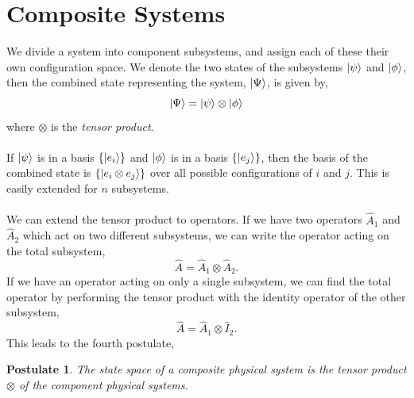 \documentclass{book}
\newtheorem{postulate}{\textbf{Postulate}}
\begin{document}
\section{Composite Systems}
We divide a system into component subsystems, and assign each of these their own configuration space. We denote the two states of the subsystems $\ket{\psi}$ and $\ket{\phi}$, then the combined state representing the system, $\ket{\Psi}$, is given by,
\begin{equation}
	\ket{\Psi}=\ket{\psi}\otimes\ket{\phi}
\end{equation}
where $\otimes$ is the \textit{tensor product}. 
\\\\
If $\ket{\psi}$ is in a basis $\left\{\ket{e_i}\right\}$ and $\ket{\phi}$ is in a basis $\left\{\ket{e_j}\right\}$, then the basis of the combined state is $\left\{\ket{e_i\otimes e_j}\right\}$ over all possible configurations of $i$ and $j$. This is easily extended for $n$ subsystems.
\\\\
We can extend the tensor product to operators. If we have two operators $\hat{A}_1$ and $\hat{A}_2$ which act on two different subsystems, we can write the operator acting on the total subsystem,
\begin{equation}
	\hat{A} = \hat{A}_1 \otimes \hat{A}_2.
\end{equation}
If we have an operator acting on only a single subsystem, we can find the total operator by performing the tensor product with the identity operator of the other subsystem,
\begin{equation}
	\hat{A} = \hat{A}_1 \otimes \hat{I}_2.
\end{equation}
This leads to the fourth postulate,
\begin{postulate}
	The state space of a composite physical system is the tensor product $\otimes$ of the component physical systems.
\end{postulate}
\end{document}
